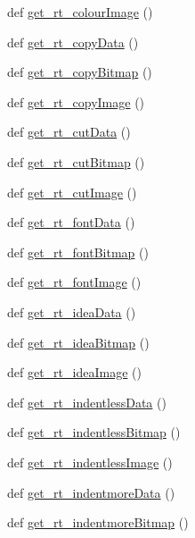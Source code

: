 \begin{DoxyCompactItemize}
def \hyperlink{namespaceimages_ab64671d6d1511c9f58621501f4a9c0eb}{get\+\_\+rt\+\_\+colour\+Image} ()
\item 
def \hyperlink{namespaceimages_ab5eacef04318a348f0c9e295ce5f6a64}{get\+\_\+rt\+\_\+copy\+Data} ()
\item 
def \hyperlink{namespaceimages_a8c9dc9f544537b5cc82cd4b2d139f90d}{get\+\_\+rt\+\_\+copy\+Bitmap} ()
\item 
def \hyperlink{namespaceimages_a969422c25196c4c9142996c542c8e20c}{get\+\_\+rt\+\_\+copy\+Image} ()
\item 
def \hyperlink{namespaceimages_a88736560f7eb544aa69442ba704cffd6}{get\+\_\+rt\+\_\+cut\+Data} ()
\item 
def \hyperlink{namespaceimages_abf3deb680d420f30bc46ab3d8eb77dd9}{get\+\_\+rt\+\_\+cut\+Bitmap} ()
\item 
def \hyperlink{namespaceimages_afb08afa7f129f5a1687116c72ff11b35}{get\+\_\+rt\+\_\+cut\+Image} ()
\item 
def \hyperlink{namespaceimages_a1b911d4fa04b4af968ec1adc8d82e9f1}{get\+\_\+rt\+\_\+font\+Data} ()
\item 
def \hyperlink{namespaceimages_a8fabb5570ed966b2dd46d7e154c1ee16}{get\+\_\+rt\+\_\+font\+Bitmap} ()
\item 
def \hyperlink{namespaceimages_a934c1076ea7244d3996bb80131c3ad3c}{get\+\_\+rt\+\_\+font\+Image} ()
\item 
def \hyperlink{namespaceimages_a37c278ef96ae60271be822aa05328780}{get\+\_\+rt\+\_\+idea\+Data} ()
\item 
def \hyperlink{namespaceimages_a3da1175f8c1f38ab38d6f68b3355bd50}{get\+\_\+rt\+\_\+idea\+Bitmap} ()
\item 
def \hyperlink{namespaceimages_a476483666934d1a89f0b20cc805d5ed7}{get\+\_\+rt\+\_\+idea\+Image} ()
\item 
def \hyperlink{namespaceimages_afe77e2f882a006343c9553de97d91360}{get\+\_\+rt\+\_\+indentless\+Data} ()
\item 
def \hyperlink{namespaceimages_a32bd9d50c996f821dad7aec8a88b1f28}{get\+\_\+rt\+\_\+indentless\+Bitmap} ()
\item 
def \hyperlink{namespaceimages_a56a4748435e020106beb32db21000723}{get\+\_\+rt\+\_\+indentless\+Image} ()
\item 
def \hyperlink{namespaceimages_a9f00d442ac6533725d70f75e8a0e7bde}{get\+\_\+rt\+\_\+indentmore\+Data} ()
\item 
def \hyperlink{namespaceimages_ae925d38b26aed70dce5b33f1c5d440cf}{get\+\_\+rt\+\_\+indentmore\+Bitmap} ()

\end{DoxyCompactItemize}
